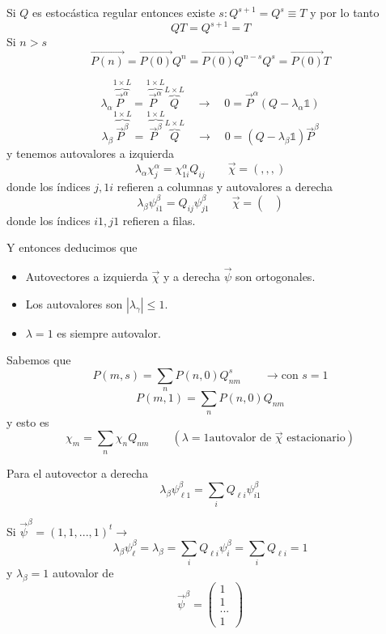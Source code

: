\documentclass[10pt,oneside]{CBFT_book}
\begin{document}
Si $Q$ es estocástica regular entonces existe $s : Q^{s+1} = Q^s \equiv T$ y por lo tanto
\[
	Q T = Q^{s+1} = T
\]
Si $n>s$
\[
	\vec{P(n)} = \vec{P(0)} Q^n = \vec{P(0)} Q^{n-s} Q^s = \vec{P(0)} T
\]

\[
	\lambda_\alpha \overbrace{\vec{P}^\alpha}^{1\times L} =  
	\overbrace{\vec{P}^\alpha}^{1\times L} \overbrace{Q}^{L\times L}
	\quad \rightarrow \quad 0 = \vec{P}^\alpha (Q-\lambda_\alpha \mathbb{1}) 
\]
\[
	\lambda_\beta \overbrace{\vec{P}^\beta}^{1\times L} = 
	\overbrace{\vec{P}^\beta}^{1\times L} \overbrace{Q}^{L\times L}
	\quad \rightarrow \quad  0 = (Q-\lambda_\beta \mathbb{1}) \vec{P}^\beta
\]
y tenemos autovalores a izquierda
\[
	\lambda_\alpha \chi_j^\alpha = \chi_{1i}^\alpha Q_{ij} \qquad \vec{\chi} = (,,,)
\]
donde los índices $j,1i$ refieren a columnas y autovalores a derecha
\[
	\lambda_\beta \psi_{i1}^\beta = Q_{ij} \psi_{j1}^\beta \qquad \vec{\chi} = 
									\begin{pmatrix}
									\\
                                                                        \\
                                                                        
                                                                        \end{pmatrix}
\]
donde los índices $i1,j1$ refieren a filas.


Y entonces deducimos que 
\begin{itemize}
 \item Autovectores a izquierda $\vec{\chi}$ y a derecha $\vec{\psi}$ son ortogonales.
 \item Los autovalores son $|\lambda_\gamma|\leq 1$.
 \item $\lambda = 1$ es siempre autovalor.
\end{itemize}

Sabemos que 
\[
	P(m,s) = \sum_n P(n,0) Q^s_{nm} \qquad \rightarrow \text{con $s=1$}
\]
\[
	P(m,1) = \sum_n P(n,0) Q_{nm}
\]
y esto es 
\[
	\chi_m = \sum_n \chi_n Q_{nm}  \qquad (\lambda=1 \text{autovalor de $\vec{\chi}$ 
estacionario})
\]

Para el autovector a derecha 
\[
	\lambda_\beta \psi_{\ell 1}^\beta = \sum_i Q_{\ell i} \psi_{i1}^\beta
\]

Si $ \vec{\psi}^\beta = (1,1,...,1)^t\rightarrow$
\[
	\lambda_\beta \psi_\ell^\beta = \lambda_\beta = \sum_i Q_{\ell i} \psi_i^\beta
	= \sum_i Q_{\ell i} = 1
\]
y $\lambda_\beta=1$ autovalor de 
\[
	\vec{\psi}^\beta = \begin{pmatrix}
	 1\\
	 1\\
	 ...\\
	 1
	\end{pmatrix}
\]
\end{document}

